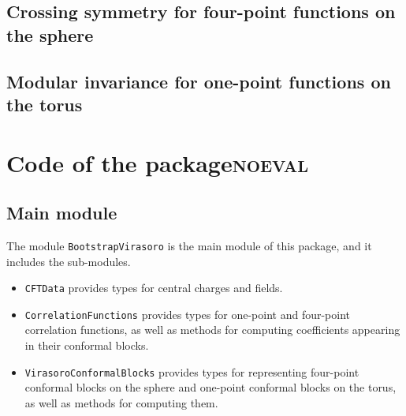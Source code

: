 \documentclass[a4paper]{article}
\numberwithin{equation}{section}
\begin{document}
\subsection{Crossing symmetry for four-point functions on the sphere}
\label{sec:org8b7f227}

\subsection{Modular invariance for one-point functions on the torus}
\label{sec:org6624903}
\section{Code of the package\hfill{}\textsc{noeval}}
\label{sec:orgaf4743d}

\subsection{Main module}
\label{sec:orga85c686}
The module \texttt{BootstrapVirasoro} is the main module of this package, and it includes the sub-modules.

\begin{itemize}
\item \texttt{CFTData} provides types for central charges and fields.
\item \texttt{CorrelationFunctions} provides types for one-point and four-point correlation functions, as well as methods for computing coefficients appearing in their conformal blocks.
\item \texttt{VirasoroConformalBlocks} provides types for representing four-point conformal blocks on the sphere and one-point conformal blocks on the torus, as well as methods for computing them.
\end{itemize}
\end{document}
